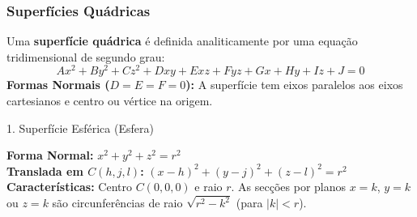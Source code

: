 \documentclass[11pt,a4paper]{article}
\begin{document}
\subsubsection{Superfícies Quádricas}
Uma \textbf{superfície quádrica} é definida analiticamente por uma equação tridimensional de segundo grau:
\begin{equation*}
  Ax^2 + By^2 + Cz^2 + Dxy + Exz + Fyz + Gx + Hy + Iz + J = 0
\end{equation*}
\textbf{Formas Normais ($D = E = F = 0$):} A superfície tem eixos paralelos aos eixos cartesianos e centro ou vértice na origem.

\begin{formulabox}[top=2pt, bottom=2pt, left=4pt, right=4pt]{1. Superfície Esférica (Esfera)}
  \begin{minipage}{0.72\textwidth}
    \textbf{Forma Normal:} $x^2 + y^2 + z^2 = r^2$ \\
    \textbf{Translada em $C(h,j,l)$:} $(x-h)^2 + (y-j)^2 + (z-l)^2 = r^2$ \\
    \textbf{Características:} Centro $C(0,0,0)$ e raio $r$. As secções por planos $x=k$, $y=k$ ou $z=k$ são circunferências de raio $\sqrt{r^2-k^2}$ (para $|k| < r$).
  \end{minipage}%
  \hfill
  \begin{minipage}{0.24\textwidth}
    \centering
  \end{minipage}
\end{formulabox}
\end{document}

